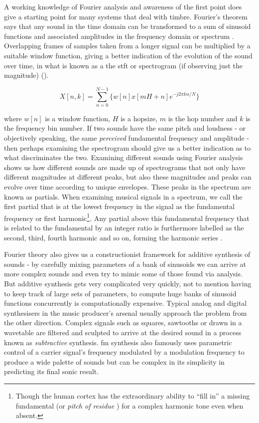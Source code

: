 {{A working knowledge of Fourier analysis and awareness of the first point does give a starting point for many systems that deal with timbre. Fourier's theorem says that any sound in the time domain can be transformed to a sum of sinusoid functions and associated amplitudes in the frequency domain or spectrum \citep{Roads1996}. Overlapping frames of samples taken from a longer signal can be multiplied by a suitable window function, giving a better indication of the evolution of the sound over time, in what is known as a the \acrshort{stft} or spectrogram (if observing just the magnitude) \citep{Collins2010}().

\begin{equation}
\label{eq:stft}
X[n,k] = \sum_{n=0}^{N-1}\{w[n]x[mH+n]e^{-j2\pi kn/N}\}
\end{equation}

where $w[n]$ is a window function, $H$ is a hopsize, $m$ is the hop number and $k$ is the frequency bin number. If two sounds have the same pitch and loudness - or objectively speaking, the same \textit{perceived} fundamental frequency and amplitude - then perhaps examining the spectrogram should give us a better indication as to what discriminates the two. Examining different sounds using Fourier analysis shows us how different sounds are made up of spectrograms that not only have different magnitudes at different peaks, but also these magnitudes and peaks can evolve over time according to unique envelopes. These peaks in the spectrum are known as partials. When examining musical signals in a spectrum, we call the first partial that is at the lowest frequency in the signal as the fundamental frequency or first harmonic\footnote{Though the human cortex has the extraordinary ability to ``fill in'' a missing fundamental (or \textit{pitch of residue} \citep{Weihs2009}) for a complex harmonic tone even when absent.}. Any partial above this fundamental frequency that is related to the fundamental by an integer ratio is furthermore labelled as the second, third, fourth harmonic and so on, forming the harmonic series \citep{Puckette2006}.

Fourier theory also gives us a constructionist framework for additive synthesis of sounds - by carefully mixing parameters of a bank of sinusoids we can arrive at more complex sounds and even try to mimic some of those found via analysis. But additive synthesis gets very complicated very quickly, not to mention having to keep track of large sets of parameters, to compute huge banks of sinusoid functions concurrently is computationally expensive. Typical analog and digital synthesisers in the music producer's arsenal usually approach the problem from the other direction. Complex signals such as squares, sawtooths or drawn in a wavetable are filtered and sculpted to arrive at the desired sound in a process known as \textit{subtractive} synthesis. \acrfull{fm} synthesis also famously uses parametric control of a carrier signal's frequency modulated by a modulation frequency to produce a wide palette of sounds but can be complex in its simplicity in predicting its final sonic result. 
 
}}
